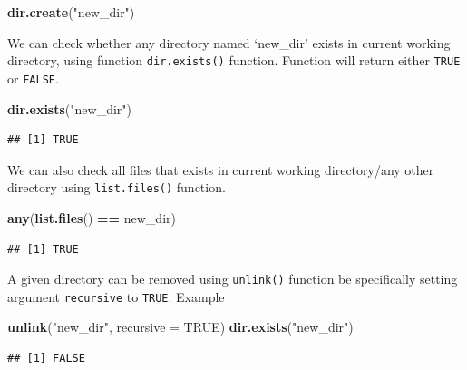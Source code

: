 \documentclass[
]{book}
\newenvironment{Shaded}{\begin{snugshade}}{\end{snugshade}}
\newcommand{\AttributeTok}[1]{\textcolor[rgb]{0.13,0.29,0.53}{#1}}
\newcommand{\ConstantTok}[1]{\textcolor[rgb]{0.56,0.35,0.01}{#1}}
\newcommand{\FunctionTok}[1]{\textcolor[rgb]{0.13,0.29,0.53}{\textbf{#1}}}
\newcommand{\NormalTok}[1]{#1}
\newcommand{\SpecialCharTok}[1]{\textcolor[rgb]{0.81,0.36,0.00}{\textbf{#1}}}
\newcommand{\StringTok}[1]{\textcolor[rgb]{0.31,0.60,0.02}{#1}}
\begin{document}
\begin{Shaded}
\begin{Highlighting}[]
\FunctionTok{dir.create}\NormalTok{(}\StringTok{"new\_dir"}\NormalTok{)}
\end{Highlighting}
\end{Shaded}

We can check whether any directory named `new\_dir' exists in current working directory, using function \texttt{dir.exists()} function. Function will return either \texttt{TRUE} or \texttt{FALSE}.

\begin{Shaded}
\begin{Highlighting}[]
\FunctionTok{dir.exists}\NormalTok{(}\StringTok{"new\_dir"}\NormalTok{)}
\end{Highlighting}
\end{Shaded}

\begin{verbatim}
## [1] TRUE
\end{verbatim}

We can also check all files that exists in current working directory/any other directory using \texttt{list.files()} function.

\begin{Shaded}
\begin{Highlighting}[]
\FunctionTok{any}\NormalTok{(}\FunctionTok{list.files}\NormalTok{() }\SpecialCharTok{==} \StringTok{\textquotesingle{}new\_dir\textquotesingle{}}\NormalTok{)}
\end{Highlighting}
\end{Shaded}

\begin{verbatim}
## [1] TRUE
\end{verbatim}

A given directory can be removed using \texttt{unlink()} function be specifically setting argument \texttt{recursive} to \texttt{TRUE}. Example

\begin{Shaded}
\begin{Highlighting}[]
\FunctionTok{unlink}\NormalTok{(}\StringTok{"new\_dir"}\NormalTok{, }\AttributeTok{recursive =} \ConstantTok{TRUE}\NormalTok{)}
\FunctionTok{dir.exists}\NormalTok{(}\StringTok{"new\_dir"}\NormalTok{)}
\end{Highlighting}
\end{Shaded}

\begin{verbatim}
## [1] FALSE
\end{verbatim}
\end{document}
